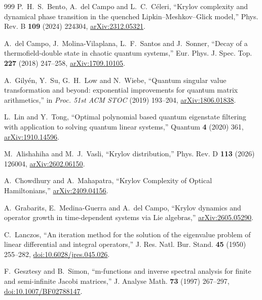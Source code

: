 \documentclass[a4paper,11pt]{article}
\theoremstyle{definition}
\theoremstyle{remark}
\begin{document}
\begin{thebibliography}{999}
P.~H.~S.~Bento, A.~del Campo and L.~C.~C\'eleri,
``Krylov complexity and dynamical phase transition in the quenched Lipkin--Meshkov--Glick model,''
Phys. Rev. B \textbf{109} (2024) 224304,
\href{https://arxiv.org/abs/2312.05321}{arXiv:2312.05321}.

A.~del Campo, J.~Molina-Vilaplana, L.~F.~Santos and J.~Sonner,
``Decay of a thermofield-double state in chaotic quantum systems,''
Eur. Phys. J. Spec. Top. \textbf{227} (2018) 247--258,
\href{https://arxiv.org/abs/1709.10105}{arXiv:1709.10105}.

A.~Gily\'en, Y.~Su, G.~H.~Low and N.~Wiebe,
``Quantum singular value transformation and beyond: exponential improvements for quantum matrix arithmetics,''
in \emph{Proc. 51st ACM STOC} (2019) 193--204,
\href{https://arxiv.org/abs/1806.01838}{arXiv:1806.01838}.

L.~Lin and Y.~Tong,
``Optimal polynomial based quantum eigenstate filtering with application to solving quantum linear systems,''
Quantum \textbf{4} (2020) 361,
\href{https://arxiv.org/abs/1910.14596}{arXiv:1910.14596}.

M.~Alishahiha and M.~J.~Vasli, ``Krylov distribution,''
Phys. Rev. D \textbf{113} (2026) 126004,
\href{https://arxiv.org/abs/2602.06150}{arXiv:2602.06150}.

A.~Chowdhury and A.~Mahapatra,
``Krylov Complexity of Optical Hamiltonians,''
\href{https://arxiv.org/abs/2409.04156}{arXiv:2409.04156}.

A.~Grabarits, E.~Medina-Guerra and A.~del Campo, ``Krylov dynamics and operator growth in time-dependent systems via Lie algebras,'' \href{https://arxiv.org/abs/2605.05290}{arXiv:2605.05290}.

C.~Lanczos, ``An iteration method for the solution of the eigenvalue problem of linear differential and integral operators,'' J. Res. Natl. Bur. Stand. \textbf{45} (1950) 255--282,
\href{https://doi.org/10.6028/jres.045.026}{doi:10.6028/jres.045.026}.

F.~Gesztesy and B.~Simon, ``m-functions and inverse spectral analysis for finite and semi-infinite Jacobi matrices,'' J. Analyse Math. \textbf{73} (1997) 267--297,
\href{https://doi.org/10.1007/BF02788147}{doi:10.1007/BF02788147}.


\end{thebibliography}
\end{document}
